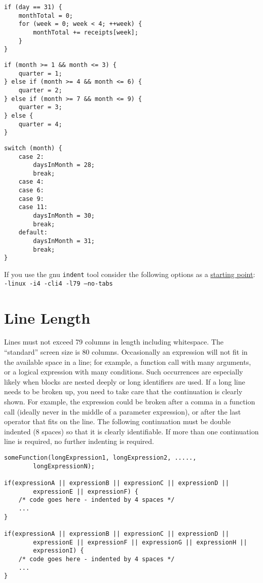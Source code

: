 \documentclass{article}
\begin{document}
\begin{lstlisting}
if (day == 31) {
    monthTotal = 0;
    for (week = 0; week < 4; ++week) {
        monthTotal += receipts[week];
    }
}
\end{lstlisting}

\begin{lstlisting}
if (month >= 1 && month <= 3) {
    quarter = 1;
} else if (month >= 4 && month <= 6) {
    quarter = 2;
} else if (month >= 7 && month <= 9) {
    quarter = 3;
} else {
    quarter = 4;
}
\end{lstlisting}

\begin{lstlisting}
switch (month) {
    case 2:
        daysInMonth = 28;
        break;
    case 4:
    case 6:
    case 9:
    case 11:
        daysInMonth = 30;
        break;
    default:
        daysInMonth = 31;
        break;
}
\end{lstlisting}

If you use the gnu \texttt{indent} tool consider the following options as a \underline{starting point}:\\
\texttt{-linux -i4 -cli4 -l79 --no-tabs}

\clearpage
\section{Line Length}
Lines must not exceed 79 columns in length including whitespace.
The ``standard'' screen size is 80 columns.
Occasionally an expression will not fit in the available space in a line; for example, a function call with many arguments, or a logical expression with many conditions.
Such occurrences are especially likely when blocks are nested deeply or long identifiers are used.
If a long line needs to be broken up, you need to take care that the continuation is clearly shown.
For example, the expression could be broken after a comma in a function call (ideally never in the middle of a parameter expression), or after the last operator that fits on the line.
The following continuation must be double indented (8 spaces) so that it is clearly identifiable.
If more than one continuation line is required, no further indenting is required.

\begin{lstlisting}
someFunction(longExpression1, longExpression2, .....,
        longExpressionN);

if(expressionA || expressionB || expressionC || expressionD ||
        expressionE || expressionF) {
    /* code goes here - indented by 4 spaces */
    ...
}

if(expressionA || expressionB || expressionC || expressionD ||
        expressionE || expressionF || expressionG || expressionH ||
        expressionI) {
    /* code goes here - indented by 4 spaces */
    ...
}
\end{lstlisting}
\end{document}
